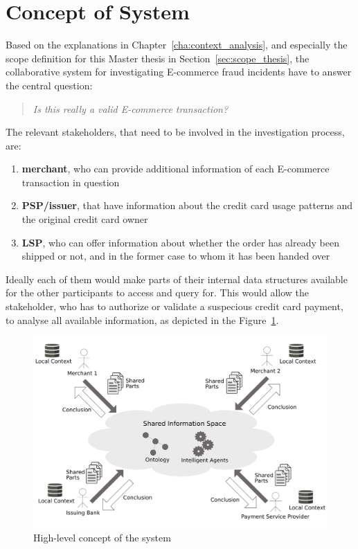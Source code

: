 
\section{Concept of System}
\label{sec:system_concept}

Based on the explanations in Chapter~\ref{cha:context_analysis}, and especially the scope definition for this Master thesis in Section~\ref{sec:scope_thesis}, the collaborative system for investigating \gls{E-commerce} fraud incidents have to answer the central question:\@

\begin{quotation}
  \textit{Is this really a valid \gls{E-commerce} transaction?}
\end{quotation}

The relevant stakeholders, that need to be involved in the investigation process, are:\@

\begin{enumerate}
    \item \textbf{merchant}, who can provide additional information of each \gls{E-commerce} transaction in question
    \item \textbf{\gls{PSP}/issuer}, that have information about the credit card usage patterns and the original credit card owner
    \item \textbf{\gls{LSP}}, who can offer information about whether the order has already been shipped or not, and in the former case to whom it has been handed over
\end{enumerate}

Ideally each of them would make parts of their internal data structures available for the other participants to access and query for. This would allow the stakeholder, who has to authorize or validate a suspecious credit card payment, to analyse all available information, as depicted in the Figure~\ref{fig:images_system_overview}.\@

\begin{figure}[H]
	\centering
		\includegraphics[width=0.9\columnwidth]{images/system_overview.pdf}
	\caption{High-level concept of the system}
\label{fig:images_system_overview}
\end{figure}

